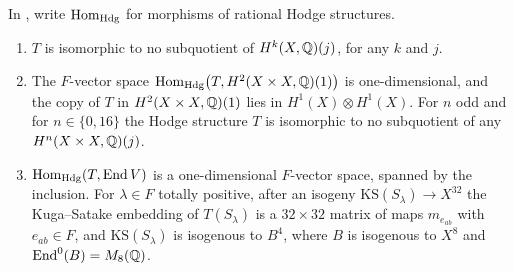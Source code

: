 \begin{proposition}\label{prop:mumfordwhere}
In , write $\operatorname{Hom}_{\mathrm{Hdg}}$ for morphisms of rational
Hodge structures.
\begin{enumerate}[label=\textup{(\roman*)},nosep,leftmargin=2.6em]
\item $T$ is isomorphic to no subquotient of $H^{k}(X,\mathbb{Q})(j)$, for any $k$
  and $j$.
\item The $F$-vector space
  $\operatorname{Hom}_{\mathrm{Hdg}}\bigl(T,H^{2}(X\times X,\mathbb{Q})(1)\bigr)$ is
  one-dimensional, and the copy of $T$ in $H^{2}(X\times X,\mathbb{Q})(1)$ lies in
  $H^{1}(X)\otimes H^{1}(X)$. For $n$ odd and for $n\in\{0,16\}$ the Hodge
  structure $T$ is isomorphic to no subquotient of any
  $H^{n}(X\times X,\mathbb{Q})(j)$.
\item $\operatorname{Hom}_{\mathrm{Hdg}}(T,\operatorname{End} V)$ is a one-dimensional $F$-vector space,
  spanned by the inclusion. For $\lambda\in F$ totally positive, after an
  isogeny $\mathrm{KS}(S_{\lambda})\to X^{32}$ the Kuga--Satake embedding of
  $T(S_{\lambda})$ is a $32\times32$ matrix of maps $m_{e_{ab}}$ with
  $e_{ab}\in F$, and $\mathrm{KS}(S_{\lambda})$ is isogenous to $B^{4}$, where
  $B$ is isogenous to $X^{8}$ and $\operatorname{End}^{0}(B)=M_{8}(\mathbb{Q})$.
\end{enumerate}
\end{proposition}

